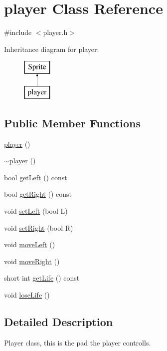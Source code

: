 \hypertarget{classplayer}{\section{player Class Reference}
\label{classplayer}
}


{\ttfamily \#include $<$player.\-h$>$}

Inheritance diagram for player\-:\begin{figure}[H]
\begin{center}
\leavevmode
\includegraphics[height=2.000000cm]{classplayer}
\end{center}
\end{figure}
\subsection*{Public Member Functions}
\begin{DoxyCompactItemize}
\item 
\hyperlink{classplayer_a97de83bce15f880241f561b55b016b02}{player} ()
\item 
\hyperlink{classplayer_aab5d2e47b80e0481f09ca0df8b823057}{$\sim$player} ()
\item 
bool \hyperlink{classplayer_a7e688c3070a1d177c5feca760d3c5d58}{get\-Left} () const 
\item 
bool \hyperlink{classplayer_ac7b4b5cf847d851ccb641e878d0ea50d}{get\-Right} () const 
\item 
void \hyperlink{classplayer_a381a5124691a73dd070d2d77bda937ac}{set\-Left} (bool L)
\item 
void \hyperlink{classplayer_a67b3c5f0d7533752b41e4094ac5a1743}{set\-Right} (bool R)
\item 
void \hyperlink{classplayer_a249c3d07b1658c079986646d54dc68f8}{move\-Left} ()
\item 
void \hyperlink{classplayer_aaefc0828be249ecc5a02c5431fda40c5}{move\-Right} ()
\item 
short int \hyperlink{classplayer_a6def826c0e7c2f169c6be74dbcd754b3}{get\-Life} () const 
\item 
void \hyperlink{classplayer_a1e9ab2a4e6896d08cef4a3d96d57bd8d}{lose\-Life} ()
\end{DoxyCompactItemize}


\subsection{Detailed Description}
Player class, this is the pad the player controlls.

